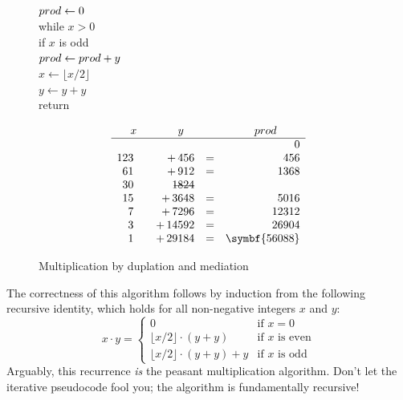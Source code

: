 \begin{figure}[ht]
\centering
\begin{minipage}[c]{0.5\linewidth}
\begin{pseudocode}
\\
$prod \gets 0$\\
while $x > 0$\\
\Indent if $x$ is odd\\
\Indent\Indent $prod \gets prod + y$\\
\Indent $x \gets \lfloor x/2 \rfloor$\\
\Indent $y \gets y + y$\\
return 
\end{pseudocode}
\end{minipage}
\hfill
\begin{minipage}[c]{0.45\linewidth}
\[
\begin{array}{r@{\qquad}r@{\quad}c@{\quad}r}
\multicolumn{1}{c}{x} & \multicolumn{1}{c}{y} & & \multicolumn{1}{c}{\Var{prod}}\\
\hline
 & & & 0\\
123 & {+}\,456 & = & 456\\
61 & {+}\,912 & = & 1368\\
30 & \makebox[0pt][r]{$1824$}\makebox[0pt][r]{\rule[0.45ex]{1.85em}{0.4pt}} & & \\
15 & {+}\,3648 & = & 5016\\
7 & {+}\,7296 & = & 12312\\
3 & {+}\,14592 & = & 26904\\
1 & {+}\,29184 & = & \symbf{56088}
\end{array}
\]
\end{minipage}
\caption{Multiplication by duplation and mediation}
\label{fig:0.3}
\end{figure}
The correctness of this algorithm follows by induction from the following recursive identity, which holds for all non-negative integers $x$ and $y$:
\[
x \cdot y = \begin{cases}
0 & \text{if } x = 0\\
\lfloor x/2 \rfloor \cdot (y+y) & \text{if } x \text{ is even}\\
\lfloor x/2 \rfloor \cdot (y+y) + y & \text{if } x \text{ is odd}
\end{cases}
\]
Arguably, this recurrence \textit{is} the peasant multiplication algorithm. Don’t let the iterative pseudocode fool you; the algorithm is fundamentally recursive!

